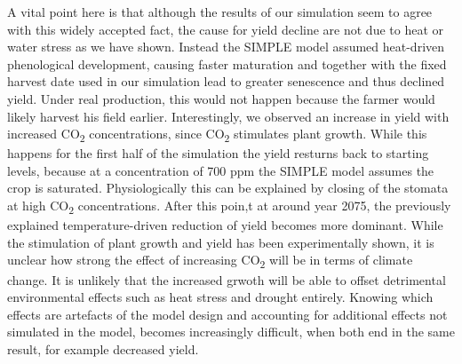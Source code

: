 \documentclass[a4paper,12pt,oneside]{article}
\begin{document}
A vital point here is that although the results of our simulation seem to agree with this widely accepted fact, the cause for yield decline are not due to heat or water stress as we have shown. Instead the SIMPLE model assumed heat-driven phenological development, causing faster maturation and together with the fixed harvest date used in our simulation lead to greater senescence and thus declined yield. Under real production, this would not happen because the farmer would likely harvest his field earlier. Interestingly, we observed an increase in yield with increased CO\textsubscript{2} concentrations, since CO\textsubscript{2} stimulates plant growth. While this happens for the first half of the simulation the yield resturns back to starting levels, because at a concentration of 700 ppm the SIMPLE model assumes the crop is saturated. Physiologically this can be explained by closing of the stomata at high CO\textsubscript{2} concentrations. After this poin,t at around year 2075, the previously explained temperature-driven reduction of yield becomes more dominant. While the stimulation of plant growth and yield has been experimentally shown, it is unclear  how strong the effect of increasing CO\textsubscript{2} will be in terms of climate change. It is unlikely that the increased grwoth will be able to offset detrimental environmental effects such as heat stress and drought entirely.
Knowing which effects are artefacts of the model design and accounting for additional effects not simulated in the model, becomes increasingly difficult, when both end in the same result, for example decreased yield.\\
\end{document}
